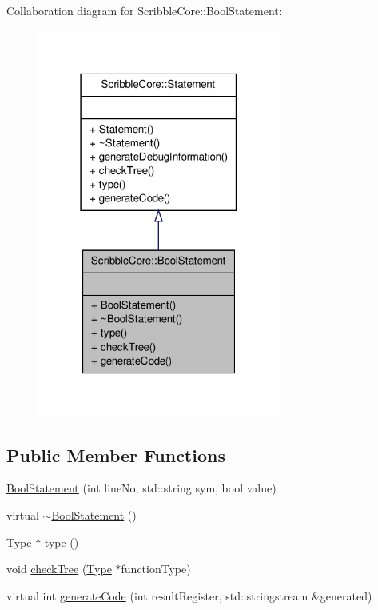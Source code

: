 Collaboration diagram for Scribble\-Core\-:\-:Bool\-Statement\-:
\nopagebreak
\begin{figure}[H]
\begin{center}
\leavevmode
\includegraphics[width=226pt]{class_scribble_core_1_1_bool_statement__coll__graph}
\end{center}
\end{figure}
\subsection*{Public Member Functions}
\begin{DoxyCompactItemize}
\item 
\hyperlink{class_scribble_core_1_1_bool_statement_a0efd34bd9ef8bb593a1e61edf65e8357}{Bool\-Statement} (int line\-No, std\-::string sym, bool value)
\item 
virtual \hyperlink{class_scribble_core_1_1_bool_statement_a293f759a61c6ac9dd92c29d8747e048d}{$\sim$\-Bool\-Statement} ()
\item 
\hyperlink{class_scribble_core_1_1_type}{Type} $\ast$ \hyperlink{class_scribble_core_1_1_bool_statement_a9043d79db97bea428df58818d8e6de38}{type} ()
\item 
void \hyperlink{class_scribble_core_1_1_bool_statement_a7992602b1bb4a27ccb588c0d643a159f}{check\-Tree} (\hyperlink{class_scribble_core_1_1_type}{Type} $\ast$function\-Type)
\item 
virtual int \hyperlink{class_scribble_core_1_1_bool_statement_a776c4acf8cc4c0e4b0a0228df85a1fe8}{generate\-Code} (int result\-Register, std\-::stringstream \&generated)
\end{DoxyCompactItemize}


